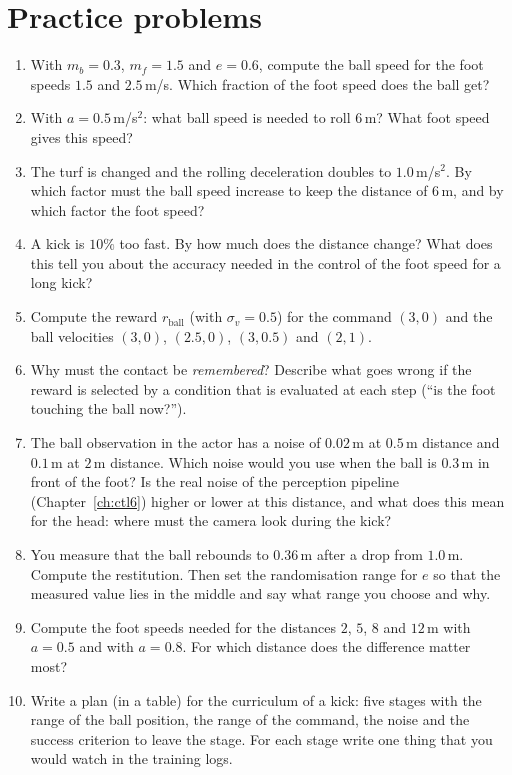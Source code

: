 \section*{Practice problems}
\begin{enumerate}[label=\textbf{\thechapter.\arabic*}]
  \item With $m_b=0.3$, $m_f=1.5$ and $e=0.6$, compute the ball speed for the foot speeds $1.5$ and $2.5$\,m/s. Which fraction of the foot speed does the ball get?
  \item With $a=0.5$\,m/s$^2$: what ball speed is needed to roll $6$\,m? What foot speed gives this speed?
  \item The turf is changed and the rolling deceleration doubles to $1.0$\,m/s$^2$. By which factor must the ball speed increase to keep the distance of $6$\,m, and by which factor the foot speed?
  \item A kick is $10\%$ too fast. By how much does the distance change? What does this tell you about the accuracy needed in the control of the foot speed for a long kick?
  \item Compute the reward $r_{\text{ball}}$ (with $\sigma_v=0.5$) for the command $(3,0)$ and the ball velocities $(3,0)$, $(2.5,0)$, $(3,0.5)$ and $(2,1)$.
  \item Why must the contact be \emph{remembered}? Describe what goes wrong if the reward is selected by a condition that is evaluated at each step (``is the foot touching the ball now?'').
  \item The ball observation in the actor has a noise of $0.02$\,m at $0.5$\,m distance and $0.1$\,m at $2$\,m distance. Which noise would you use when the ball is $0.3$\,m in front of the foot? Is the real noise of the perception pipeline (Chapter~\ref{ch:ctl6}) higher or lower at this distance, and what does this mean for the head: where must the camera look during the kick?
  \item You measure that the ball rebounds to $0.36$\,m after a drop from $1.0$\,m. Compute the restitution. Then set the randomisation range for $e$ so that the measured value lies in the middle and say what range you choose and why.
  \item Compute the foot speeds needed for the distances $2$, $5$, $8$ and $12$\,m with $a=0.5$ and with $a=0.8$. For which distance does the difference matter most?
  \item[\textbf{\thechapter.10}$\star$] Write a plan (in a table) for the curriculum of a kick: five stages with the range of the ball position, the range of the command, the noise and the success criterion to leave the stage. For each stage write one thing that you would watch in the training logs.
\end{enumerate}
